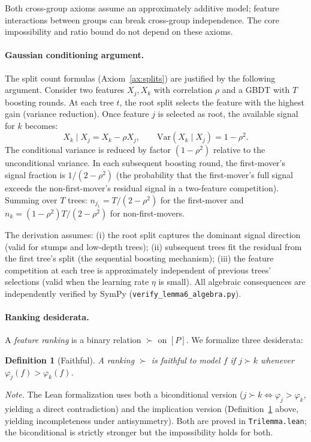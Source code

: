 \documentclass{article}
\newtheorem{definition}[theorem]{Definition}
\newcommand{\Var}{\mathrm{Var}}
\begin{document}
Both cross-group axioms assume an approximately additive model; feature interactions between groups can break cross-group independence. The core impossibility and ratio bound do not depend on these axioms.

\paragraph{Gaussian conditioning argument.}
The split count formulas (Axiom~\ref{ax:splits}) are justified by the following argument. Consider two features $X_j, X_k$ with correlation $\rho$ and a GBDT with $T$ boosting rounds. At each tree $t$, the root split selects the feature with the highest gain (variance reduction). Once feature $j$ is selected as root, the available signal for $k$ becomes:
\[
  X_k \mid X_j = X_k - \rho X_j, \qquad \Var(X_k \mid X_j) = 1 - \rho^2.
\]
The conditional variance is reduced by factor $(1-\rho^2)$ relative to the unconditional variance. In each subsequent boosting round, the first-mover's signal fraction is $1/(2-\rho^2)$ (the probability that the first-mover's full signal exceeds the non-first-mover's residual signal in a two-feature competition). Summing over $T$ trees: $n_{j_1} = T/(2-\rho^2)$ for the first-mover and $n_k = (1-\rho^2)T/(2-\rho^2)$ for non-first-movers.

The derivation assumes: (i) the root split captures the dominant signal direction (valid for stumps and low-depth trees); (ii) subsequent trees fit the residual from the first tree's split (the sequential boosting mechanism); (iii) the feature competition at each tree is approximately independent of previous trees' selections (valid when the learning rate $\eta$ is small). All algebraic consequences are independently verified by SymPy (\texttt{verify\_lemma6\_algebra.py}).

\paragraph{Ranking desiderata.}
A \emph{feature ranking} is a binary relation $\succ$ on $[P]$.
We formalize three desiderata:

\begin{definition}[Faithful]
\label{def:faithful}
A ranking $\succ$ is \emph{faithful} to model $f$ if $j \succ k$ whenever $\varphi_j(f) > \varphi_k(f)$.
\end{definition}

\noindent\emph{Note.} The Lean formalization uses both a biconditional version ($j \succ k \Leftrightarrow \varphi_j > \varphi_k$, yielding a direct contradiction) and the implication version (Definition~\ref{def:faithful} above, yielding incompleteness under antisymmetry). Both are proved in \texttt{Trilemma.lean}; the biconditional is strictly stronger but the impossibility holds for both.
\end{document}
